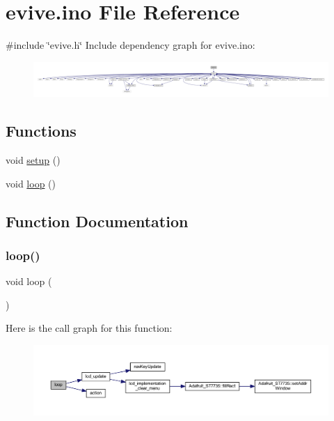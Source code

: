 \hypertarget{evive_8ino}{}\section{evive.\+ino File Reference}
\label{evive_8ino}
{\ttfamily \#include \char`\"{}evive.\+h\char`\"{}}\newline
Include dependency graph for evive.\+ino\+:\nopagebreak
\begin{figure}[H]
\begin{center}
\leavevmode
\includegraphics[width=350pt]{evive_8ino__incl}
\end{center}
\end{figure}
\subsection*{Functions}
\begin{DoxyCompactItemize}
\item 
void \hyperlink{evive_8ino_a4fc01d736fe50cf5b977f755b675f11d}{setup} ()
\item 
void \hyperlink{evive_8ino_afe461d27b9c48d5921c00d521181f12f}{loop} ()
\end{DoxyCompactItemize}


\subsection{Function Documentation}
\mbox{\label{evive_8ino_afe461d27b9c48d5921c00d521181f12f}} 
\subsubsection{\texorpdfstring{loop()}{loop()}}
{\footnotesize\ttfamily void loop (\begin{DoxyParamCaption}{ }\end{DoxyParamCaption})}

Here is the call graph for this function\+:\nopagebreak
\begin{figure}[H]
\begin{center}
\leavevmode
\includegraphics[width=350pt]{evive_8ino_afe461d27b9c48d5921c00d521181f12f_cgraph}
\end{center}
\end{figure}
\mbox{\label{evive_8ino_a4fc01d736fe50cf5b977f755b675f11d}} 
